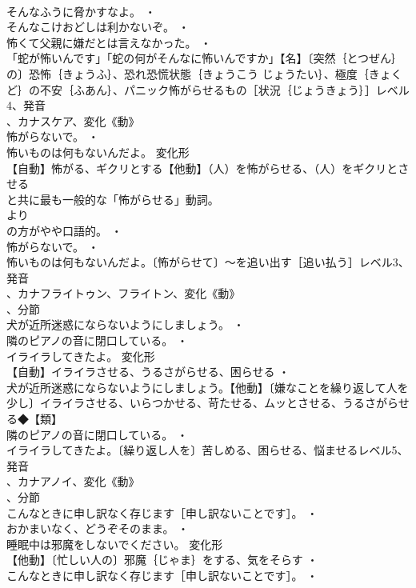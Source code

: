 \documentclass[8pt]{extreport}
\begin{document}
\begin{CJK}{UTF8}{min}
\\	そんなふうに脅かすなよ。 ・
\\	そんなこけおどしは利かないぞ。 ・
\\	怖くて父親に嫌だとは言えなかった。 ・
\\	「蛇が怖いんです」「蛇の何がそんなに怖いんですか」【名】〔突然｛とつぜん｝の〕恐怖｛きょうふ｝、恐れ恐慌状態｛きょうこう じょうたい｝、極度｛きょくど｝の不安｛ふあん｝、パニック怖がらせるもの［状況｛じょうきょう｝］レベル4、発音
\\	、カナスケア、変化《動》
\\	怖がらないで。 ・
\\	怖いものは何もないんだよ。	変化形 
\\	【自動】怖がる、ギクリとする【他動】（人）を怖がらせる、（人）をギクリとさせる
\\	と共に最も一般的な「怖がらせる」動詞。
\\	より
\\	の方がやや口語的。 ・
\\	怖がらないで。 ・
\\	怖いものは何もないんだよ。〔怖がらせて〕～を追い出す［追い払う］レベル3、発音
\\	、カナフライトゥン、フライトン、変化《動》
\\	、分節
\\	犬が近所迷惑にならないようにしましょう。 ・
\\	隣のピアノの音に閉口している。 ・
\\	イライラしてきたよ。	変化形 
\\	【自動】イライラさせる、うるさがらせる、困らせる ・
\\	犬が近所迷惑にならないようにしましょう。【他動】〔嫌なことを繰り返して人を少し〕イライラさせる、いらつかせる、苛たせる、ムッとさせる、うるさがらせる◆【類】
\\	隣のピアノの音に閉口している。 ・
\\	イライラしてきたよ。〔繰り返し人を〕苦しめる、困らせる、悩ませるレベル5、発音
\\	、カナアノイ、変化《動》
\\	、分節
\\	こんなときに申し訳なく存じます［申し訳ないことです］。 ・
\\	おかまいなく、どうぞそのまま。 ・
\\	睡眠中は邪魔をしないでください。	変化形 
\\	【他動】〔忙しい人の〕邪魔｛じゃま｝をする、気をそらす ・
\\	こんなときに申し訳なく存じます［申し訳ないことです］。 ・

\end{CJK}
\end{document}
